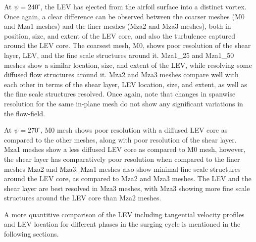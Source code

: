 At $\psi=240^\circ$, the LEV has ejected from the airfoil surface into a distinct vortex. Once again, a clear difference can be observed between the coarser meshes (M0 and Mza1 meshes) and the finer meshes (Mza2 and Mza3 meshes), both in position, size, and extent of the LEV core, and also the turbulence captured around the LEV core. The coarsest mesh, M0, shows poor resolution of the shear layer, LEV, and the fine scale structures around it. Mza1\_25 and Mza1\_50 meshes show a similar location, size, and extent of the LEV, while resolving some diffused flow structures around it. Mza2 and Mza3 meshes compare well with each other in terms of the shear layer, LEV location, size, and extent, as well as the fine scale structures resolved. Once again, note that changes in spanwise resolution for the same in-plane mesh do not show any significant variations in the flow-field. 

At $\psi=270^\circ$, M0 mesh shows poor resolution with a diffused LEV core as compared to the other meshes, along with poor resolution of the shear layer. Mza1 meshes show a less diffused LEV core as compared to M0 mesh, however, the shear layer has comparatively poor resolution when compared to the finer meshes Mza2 and Mza3. Mza1 meshes also show minimal fine scale structures around the LEV core, as compared to Mza2 and Mza3 meshes. The LEV and the shear layer are best resolved in Mza3 meshes, with Mza3 showing more fine scale structures around the LEV core than Mza2 meshes.

A more quantitive comparison of the LEV including tangential velocity profiles and LEV location for different phases in the surging cycle is mentioned in the following sections.




